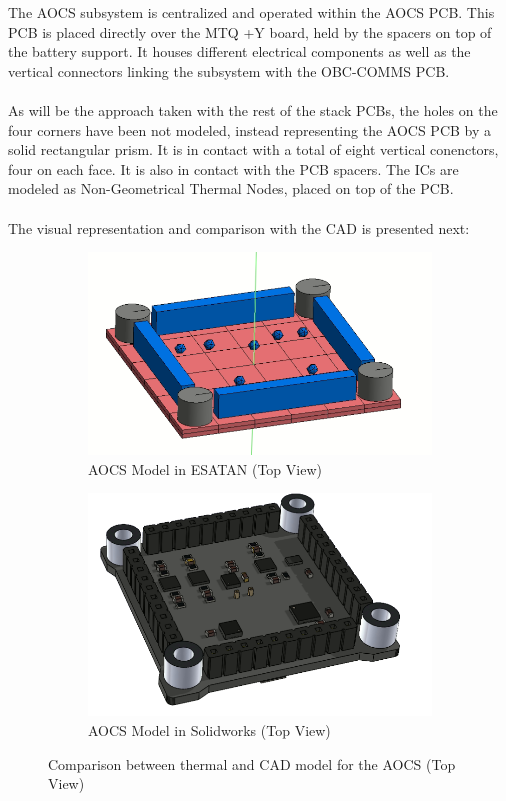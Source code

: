 The AOCS subsystem is centralized and operated within the AOCS PCB. This PCB is placed directly over the MTQ +Y board,
held by the spacers on top of the battery support. It houses different electrical components as well as the vertical connectors
linking the subsystem with the OBC-COMMS PCB.

\paragraph{}

As will be the approach taken with the rest of the stack PCBs, the holes on the four corners have been not modeled, instead
representing the AOCS PCB by a solid rectangular prism. It is in contact with a total of eight vertical conenctors, four on each face.
It is also in contact with the PCB spacers. The ICs are modeled as Non-Geometrical Thermal Nodes, placed on top of the PCB.

\paragraph{}

The visual representation and comparison with the CAD is presented next: 


\begin{figure}[H]
    \centering
    \begin{subfigure}{.5\textwidth}
      \centering
      \includegraphics[width=.6\linewidth]{res/img/5_simulationanalisys/Comparisons/ESATAN/AOCS.PNG}
      \caption{AOCS Model in ESATAN (Top View)}
      \label{fig:aocs}
    \end{subfigure}%
    \begin{subfigure}{.5\textwidth}
      \centering
      \includegraphics[width=.5\linewidth]{res/img/5_simulationanalisys/Comparisons/SLDW/AOCS_Solid.PNG}
      \caption{AOCS Model in Solidworks (Top View)}
      \label{fig:aocssolid}
    \end{subfigure}
    \caption{Comparison between thermal and CAD model for the AOCS (Top View)}
    \label{fig:aocsim}
\end{figure}

